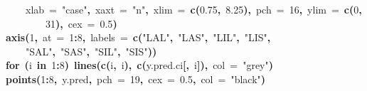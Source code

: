 \documentclass{article}
\makeatletter
\newcommand{\hlnumber}[1]{\textcolor[rgb]{0,0,0}{#1}}%
\newcommand{\hlfunctioncall}[1]{\textcolor[rgb]{.5,0,.33}{\textbf{#1}}}%
\newcommand{\hlstring}[1]{\textcolor[rgb]{.6,.6,1}{#1}}%
\newcommand{\hlkeyword}[1]{\textbf{#1}}%
\newcommand{\hlargument}[1]{\textcolor[rgb]{.69,.25,.02}{#1}}%
\newcommand{\hlsymbol}[1]{#1}%
\newcommand{\hlstd}[1]{\textcolor[rgb]{0,0,0}{#1}}%
\newenvironment{kframe}{%
 \def\FrameCommand##1{\hskip\@totalleftmargin \hskip-\fboxsep
 \colorbox{shadecolor}{##1}\hskip-\fboxsep
     \hskip-\linewidth \hskip-\@totalleftmargin \hskip\columnwidth}%
 \MakeFramed {\advance\hsize-\width
   \@totalleftmargin\z@ \linewidth\hsize
   \@setminipage}}%
 {\par\unskip\endMakeFramed}
\newenvironment{knitrout}{}{} %
\makeatother
\begin{document}
\begin{knitrout}
{\begin{kframe}
\begin{flushleft}
\hlstd{}{\ }{\ }{\ }{\ }\hlargument{xlab}{\ }\hlargument{=}{\ }\hlstring{"case"}\hlkeyword{,}{\ }\hlargument{xaxt}{\ }\hlargument{=}{\ }\hlstring{"n"}\hlkeyword{,}{\ }\hlargument{xlim}{\ }\hlargument{=}{\ }\hlfunctioncall{c}\hlkeyword{(}\hlnumber{0.75}\hlkeyword{,}{\ }\hlnumber{8.25}\hlkeyword{)}\hlkeyword{,}{\ }\hlargument{pch}{\ }\hlargument{=}{\ }\hlnumber{16}\hlkeyword{,}{\ }\hlargument{ylim}{\ }\hlargument{=}{\ }\hlfunctioncall{c}\hlkeyword{(}\hlnumber{0}\hlkeyword{,}\hspace*{\fill}\\
\hlstd{}{\ }{\ }{\ }{\ }{\ }{\ }{\ }{\ }\hlnumber{31}\hlkeyword{)}\hlkeyword{,}{\ }\hlargument{cex}{\ }\hlargument{=}{\ }\hlnumber{0.5}\hlkeyword{)}\hspace*{\fill}\\
\hlstd{}\hlfunctioncall{axis}\hlkeyword{(}\hlnumber{1}\hlkeyword{,}{\ }\hlargument{at}{\ }\hlargument{=}{\ }\hlnumber{1}\hlkeyword{:}\hlnumber{8}\hlkeyword{,}{\ }\hlargument{labels}{\ }\hlargument{=}{\ }\hlfunctioncall{c}\hlkeyword{(}\hlstring{"LAL"}\hlkeyword{,}{\ }\hlstring{"LAS"}\hlkeyword{,}{\ }\hlstring{"LIL"}\hlkeyword{,}{\ }\hlstring{"LIS"}\hlkeyword{,}\hspace*{\fill}\\
\hlstd{}{\ }{\ }{\ }{\ }\hlstring{"SAL"}\hlkeyword{,}{\ }\hlstring{"SAS"}\hlkeyword{,}{\ }\hlstring{"SIL"}\hlkeyword{,}{\ }\hlstring{"SIS"}\hlkeyword{)}\hlkeyword{)}\hspace*{\fill}\\
\hlstd{}\hlkeyword{for}{\ }\hlkeyword{(}\hlsymbol{i}{\ }\hlkeyword{in}{\ }\hlnumber{1}\hlkeyword{:}\hlnumber{8}\hlkeyword{)}{\ }\hlfunctioncall{lines}\hlkeyword{(}\hlfunctioncall{c}\hlkeyword{(}\hlsymbol{i}\hlkeyword{,}{\ }\hlsymbol{i}\hlkeyword{)}\hlkeyword{,}{\ }\hlfunctioncall{c}\hlkeyword{(}\hlsymbol{y.pred.ci}\hlkeyword{[}\hlkeyword{,}{\ }\hlsymbol{i}\hlkeyword{]}\hlkeyword{)}\hlkeyword{,}{\ }\hlargument{col}{\ }\hlargument{=}{\ }\hlstring{"grey"}\hlkeyword{)}\hspace*{\fill}\\
\hlstd{}\hlfunctioncall{points}\hlkeyword{(}\hlnumber{1}\hlkeyword{:}\hlnumber{8}\hlkeyword{,}{\ }\hlsymbol{y.pred}\hlkeyword{,}{\ }\hlargument{pch}{\ }\hlargument{=}{\ }\hlnumber{19}\hlkeyword{,}{\ }\hlargument{cex}{\ }\hlargument{=}{\ }\hlnumber{0.5}\hlkeyword{,}{\ }\hlargument{col}{\ }\hlargument{=}{\ }\hlstring{"black"}\hlkeyword{)}\hspace*{\fill}\\
\hlstd{}\hspace*{\fill}\\

\end{flushleft}
\end{kframe}}
\end{knitrout}
\end{document}
